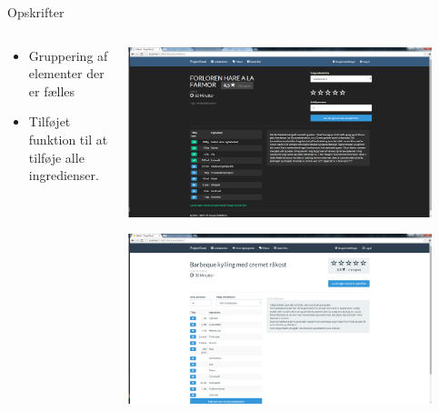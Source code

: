 \begin{frame}{Opskrifter}
	
	\begin{minipage}[0.3\textheight]{\textwidth}
	\begin{columns}[T]
	\begin{column}{0.5\textwidth}
	\begin{itemize}
	\item Gruppering af elementer der er fælles
	\item Tilføjet funktion til at tilføje alle ingredienser.

	
	\end{itemize}
	\end{column}
	\begin{column}{0.5\textwidth}
	 \includegraphics[width=0.9\textwidth,height=0.8\textheight,keepaspectratio]{images/Screenshots/PickedRecipeOld.png}
	 
	 \vspace{2 mm}
	  
	  \includegraphics[width=0.9\textwidth,height=0.8\textheight,keepaspectratio]{images/Screenshots/PickedRecipe.png}
	\end{column}
	\end{columns}
	

  \end{minipage}
  
  	
\end{frame}

